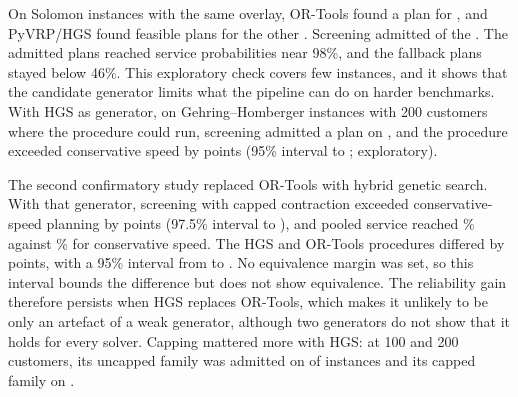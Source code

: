 \documentclass[11pt,a4paper]{article}
\begin{document}
On \SolomonN{} Solomon instances with the same overlay, OR-Tools found a plan for
\SolomonPlans{}, and PyVRP/HGS found feasible plans for the other
\SolomonNoPlan{}. Screening admitted \SolomonAdmitted{} of the \SolomonPlans{}.
The admitted plans reached service probabilities near 98\%, and the fallback
plans stayed below 46\%. This exploratory check covers few instances, and it
shows that the candidate generator limits what the pipeline can do on harder
benchmarks. With HGS as generator, on \GhAttempted{} Gehring--Homberger instances
with 200 customers where the procedure could run, screening admitted a plan on
\GhAdmitted{}, and the procedure exceeded conservative speed by \GhDiff{} points
(95\% interval \GhDiffLo{} to \GhDiffHi{}; exploratory).

The second confirmatory study replaced OR-Tools with hybrid genetic search. With
that generator, screening with capped contraction exceeded conservative-speed
planning by \CtwoGOneMean{} points (97.5\% interval \CtwoGOneLo{} to
\CtwoGOneHi{}), and pooled service reached \CtwoPooledHGSK\% against
\CtwoPooledHGSCons\% for conservative speed. The HGS and OR-Tools procedures
differed by \CtwoGFourMean{} points, with a 95\% interval from \CtwoGFourLo{} to
\CtwoGFourHi{}. No equivalence margin was set, so this interval bounds the
difference but does not show equivalence. The reliability gain therefore
persists when HGS replaces OR-Tools, which makes it unlikely to be only an
artefact of a weak generator, although two generators do not show that it
holds for every solver. Capping mattered more with HGS: at 100 and 200
customers, its uncapped family was admitted on \CtwoHGSPAdmittedLarge{} of
\CtwoLarge{} instances and its capped family on \CtwoHGSKAdmittedLarge{}.
\end{document}
